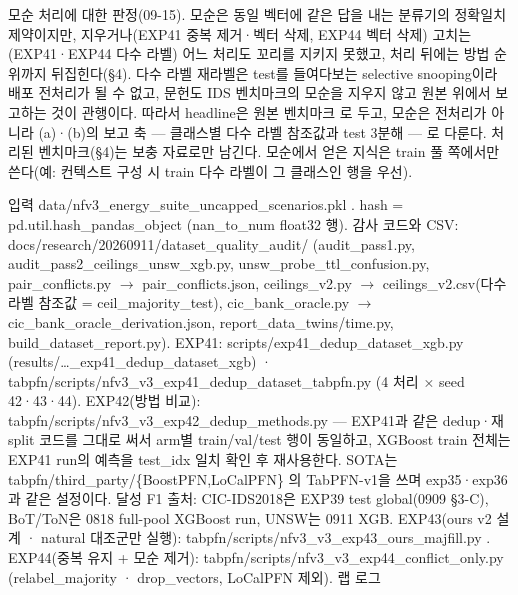 모순 처리에 대한 판정(09-15). 모순은 동일 벡터에 같은 답을 내는 분류기의 정확일치 제약이지만, 지우거나(EXP41 중복 제거·벡터 삭제, EXP44 벡터 삭제) 고치는(EXP41·EXP44 다수 라벨) 어느 처리도 꼬리를 지키지 못했고, 처리 뒤에는 방법 순위까지 뒤집힌다(§4). 다수 라벨 재라벨은 test를 들여다보는 selective snooping이라 배포 전처리가 될 수 없고, 문헌도 IDS 벤치마크의 모순을 지우지 않고 원본 위에서 보고하는 것이 관행이다. 따라서 headline은 원본 벤치마크 로 두고, 모순은 전처리가 아니라 (a)·(b)의 보고 축 — 클래스별 다수 라벨 참조값과 test 3분해 — 로 다룬다. 처리된 벤치마크(§4)는 보충 자료로만 남긴다. 모순에서 얻은 지식은 train 풀 쪽에서만 쓴다(예: 컨텍스트 구성 시 train 다수 라벨이 그 클래스인 행을 우선).

입력 data/\allowbreak{}nfv3\_\allowbreak{}energy\_\allowbreak{}suite\_\allowbreak{}uncapped\_\allowbreak{}scenarios.pkl . hash =\allowbreak{} pd.util.hash\_\allowbreak{}pandas\_\allowbreak{}object (nan\_\allowbreak{}to\_\allowbreak{}num float32 행). 감사 코드와 CSV: docs/\allowbreak{}research/\allowbreak{}20260911/\allowbreak{}dataset\_\allowbreak{}quality\_\allowbreak{}audit/\allowbreak{} (audit\_\allowbreak{}pass1.py, audit\_\allowbreak{}pass2\_\allowbreak{}ceilings\_\allowbreak{}unsw\_\allowbreak{}xgb.py, unsw\_\allowbreak{}probe\_\allowbreak{}ttl\_\allowbreak{}confusion.py, pair\_\allowbreak{}conflicts.py  \ensuremath{\rightarrow}  pair\_\allowbreak{}conflicts.json, ceilings\_\allowbreak{}v2.py  \ensuremath{\rightarrow}  ceilings\_\allowbreak{}v2.csv(다수 라벨 참조값 =\allowbreak{} ceil\_\allowbreak{}majority\_\allowbreak{}test), cic\_\allowbreak{}bank\_\allowbreak{}oracle.py  \ensuremath{\rightarrow}  cic\_\allowbreak{}bank\_\allowbreak{}oracle\_\allowbreak{}derivation.json, report\_\allowbreak{}data\_\allowbreak{}twins/\allowbreak{}time.py, build\_\allowbreak{}dataset\_\allowbreak{}report.py). EXP41: scripts/\allowbreak{}exp41\_\allowbreak{}dedup\_\allowbreak{}dataset\_\allowbreak{}xgb.py (results/\allowbreak{}…\_\allowbreak{}exp41\_\allowbreak{}dedup\_\allowbreak{}dataset\_\allowbreak{}xgb) · tabpfn/\allowbreak{}scripts/\allowbreak{}nfv3\_\allowbreak{}v3\_\allowbreak{}exp41\_\allowbreak{}dedup\_\allowbreak{}dataset\_\allowbreak{}tabpfn.py (4 처리 × seed 42·43·44). EXP42(방법 비교): tabpfn/\allowbreak{}scripts/\allowbreak{}nfv3\_\allowbreak{}v3\_\allowbreak{}exp42\_\allowbreak{}dedup\_\allowbreak{}methods.py — EXP41과 같은 dedup·재split 코드를 그대로 써서 arm별 train/\allowbreak{}val/\allowbreak{}test 행이 동일하고, XGBoost train 전체는 EXP41 run의 예측을 test\_\allowbreak{}idx 일치 확인 후 재사용한다. SOTA는 tabpfn/\allowbreak{}third\_\allowbreak{}party/\allowbreak{}\{BoostPFN,LoCalPFN\} 의 TabPFN-v1을 쓰며 exp35·exp36과 같은 설정이다. 달성 F1 출처: CIC-IDS2018은 EXP39 test global(0909 §3-C), BoT/\allowbreak{}ToN은 0818 full-pool XGBoost run, UNSW는 0911 XGB. EXP43(ours v2 설계 · natural 대조군만 실행): tabpfn/\allowbreak{}scripts/\allowbreak{}nfv3\_\allowbreak{}v3\_\allowbreak{}exp43\_\allowbreak{}ours\_\allowbreak{}majfill.py . EXP44(중복 유지 +\allowbreak{} 모순 제거): tabpfn/\allowbreak{}scripts/\allowbreak{}nfv3\_\allowbreak{}v3\_\allowbreak{}exp44\_\allowbreak{}conflict\_\allowbreak{}only.py (relabel\_\allowbreak{}majority · drop\_\allowbreak{}vectors, LoCalPFN 제외). 랩 로그 